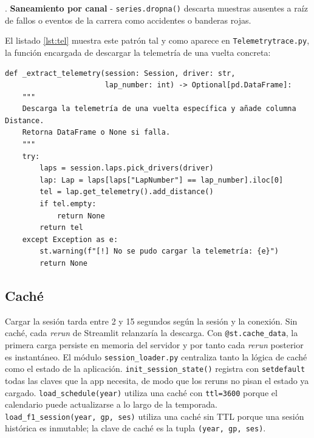\documentclass[12pt,a4paper,twoside,openright]{book}
\begin{document}
. \textbf{Saneamiento por canal} - \texttt{series.dropna()} descarta muestras ausentes a raíz de fallos o eventos de la carrera como accidentes o banderas rojas.

\noindent El listado \ref{lst:tel} muestra este patrón tal y como aparece en \texttt{Telemetrytrace.py}, la función encargada de descargar la telemetría de una vuelta concreta:

\begin{lstlisting}[style=python,caption={Patrón de acceso a telemetría en \texttt{Telemetrytrace.py}.},label=lst:tel]
def _extract_telemetry(session: Session, driver: str,
                       lap_number: int) -> Optional[pd.DataFrame]:
    """
    Descarga la telemetría de una vuelta específica y añade columna Distance.
    Retorna DataFrame o None si falla.
    """
    try:
        laps = session.laps.pick_drivers(driver)
        lap: Lap = laps[laps["LapNumber"] == lap_number].iloc[0]
        tel = lap.get_telemetry().add_distance()
        if tel.empty:
            return None
        return tel
    except Exception as e:
        st.warning(f"[!] No se pudo cargar la telemetría: {e}")
        return None
\end{lstlisting}

\subsection{Caché}
Cargar la sesión tarda entre 2 y 15 segundos según la sesión y la conexión. Sin caché, cada \textit{rerun} de Streamlit relanzaría la descarga. Con \texttt{@st.cache\_data}, la primera carga persiste en memoria del servidor y por tanto cada \textit{rerun} posterior es instantáneo.
El módulo \texttt{session\_loader.py} centraliza tanto la lógica de caché como el estado de la aplicación. \texttt{init\_session\_state()} registra con \texttt{setdefault} todas las claves que la app necesita, de modo que los reruns no pisan el estado ya cargado.
\texttt{load\_schedule(year)} utiliza una caché con \texttt{ttl=3600} porque el calendario puede actualizarse a lo largo de la temporada.
\texttt{load\_f1\_session(year, gp, ses)} utiliza una caché sin TTL porque una sesión histórica es inmutable; la clave de caché es la tupla \texttt{(year, gp, ses)}.
\end{document}
